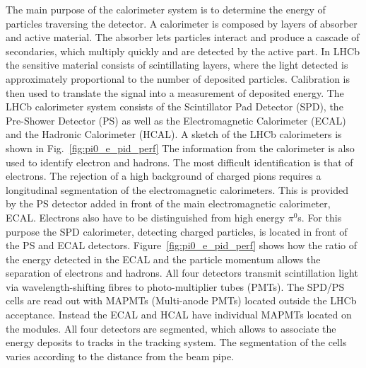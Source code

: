 The main purpose of the calorimeter system is to determine the energy of particles traversing the detector. 
A calorimeter is composed by layers of absorber and active material. The absorber lets particles
interact and produce a cascade of secondaries, which multiply quickly and are detected by the active part.
In LHCb the sensitive material consists of scintillating layers, where the light detected is approximately proportional 
to the number of deposited particles. Calibration is then used to translate the signal into a measurement 
of deposited energy. 
The LHCb calorimeter system consists of the Scintillator Pad Detector (SPD), the Pre-Shower Detector (PS)
as well as the Electromagnetic Calorimeter (ECAL) and the Hadronic Calorimeter (HCAL).
A sketch of the LHCb calorimeters is shown in Fig.~\ref{fig:pi0_e_pid_perf}
The information from the calorimeter is also used to identify electron and hadrons.
The most difficult identification is that of electrons. The rejection of a high background
of charged pions requires a longitudinal segmentation of the electromagnetic calorimeters. This is provided by
the PS detector added in front of the main electromagnetic calorimeter, ECAL. Electrons also have to be 
distinguished from high energy $\pi^0$s. For this purpose the SPD calorimeter, detecting charged particles,
is located in front of the PS and ECAL detectors. Figure~\ref{fig:pi0_e_pid_perf} shows how the ratio of the
energy detected in the ECAL and the particle momentum allows the separation of electrons and hadrons.
All four detectors transmit scintillation light via
wavelength-shifting fibres to photo-multiplier tubes (PMTs). The SPD/PS cells are read out with MAPMTs 
(Multi-anode PMTs) located outside the LHCb acceptance. Instead the ECAL and HCAL have individual MAPMTs
located on the modules. All four detectors are segmented, which allows to associate the energy
deposits to tracks in the tracking system. The segmentation of the cells varies according 
to the distance from the beam pipe.

